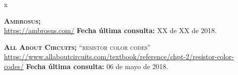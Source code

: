 
\begin{thebibliography} {x}
	
	\pagestyle{empty}
	\thispagestyle{empty}

	\begingroup %
	\raggedright 
	\sloppy
	
	 \textsc{\textbf{Ambrosus; }} \\
	\url{https://ambrosus.com/}
	\newline \textbf{Fecha última consulta:} XX de XX de 2018.
	
	 \textsc{\textbf{All About Circuits; }}\textsc{“resistor color codes”} \\ 
	\url{https://www.allaboutcircuits.com/textbook/reference/chpt-2/resistor-color-codes/}
	\newline \textbf{Fecha última consulta:} 06 de mayo de 2018.
						
		
	

		


\end{thebibliography}
